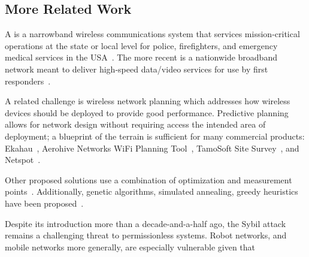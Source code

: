 
\subsection{More Related Work}

 A  is a narrowband wireless communications system that services mission-critical operations at the state or local level for police, firefighters, and emergency medical services in the USA~\cite{lmrs}. The more recent   is a nationwide broadband network meant to deliver high-speed data/video services for use by first responders~\cite{firstnet}. \medskip


 A related challenge is wireless network planning which addresses how wireless devices should be deployed to provide good performance. Predictive planning allows for network design without requiring access the intended area of deployment; a blueprint of the terrain is sufficient for many commercial products:  Ekahau~\cite{ekahau}, Aerohive Networks WiFi Planning Tool~\cite{aerohive}, TamoSoft Site Survey~\cite{tamosoft}, and Netspot~\cite{netspot}. 

Other proposed solutions use a combination of optimization and measurement points~\cite{6503906,Arya2010,Battiti2003OptimalWA,sendra:wirelesssensor,sendra:wirelesssensor,eisenblatter:integrated,kamenetsky:coverage,lin:optimization}. Additionally,  genetic algorithms, simulated annealing, greedy heuristics have been proposed~\cite{10.1371/journal.pone.0139190,maksuriwong:moga,huszak:investigation,puspitasari:implementation,zhong:methods}.  \medskip

 Despite its introduction more than a decade-and-a-half ago, the Sybil attack~\cite{douceur02sybil} remains a challenging threat to permissionless systems. Robot networks, and mobile networks more generally, are especially vulnerable given that 
